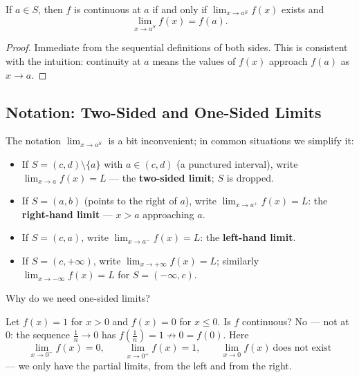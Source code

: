 \documentclass[11pt]{report}
\begin{document}
\begin{thmbox}
If $a \in S$, then $f$ is continuous at $a$ if and only if $\lim_{x\to a^S} f(x)$ exists and
\[
\lim_{x \to a^S} f(x) = f(a).
\]
\end{thmbox}

\begin{proof}
Immediate from the sequential definitions of both sides. This is consistent with the intuition: continuity at $a$ means the values of $f(x)$ approach $f(a)$ as $x \to a$.
\end{proof}

\subsection{Notation: Two-Sided and One-Sided Limits}

The notation $\lim_{x\to a^S}$ is a bit inconvenient; in common situations we simplify it:

\begin{defbox}
\begin{itemize}
    \item If $S = (c,d) \setminus \{a\}$ with $a \in (c,d)$ (a punctured interval), write $\displaystyle\lim_{x\to a} f(x) = L$ --- the \textbf{two-sided limit}; $S$ is dropped.
    \item If $S = (a, b)$ (points to the right of $a$), write $\displaystyle\lim_{x\to a^+} f(x) = L$: the \textbf{right-hand limit} --- $x > a$ approaching $a$.
    \item If $S = (c, a)$, write $\displaystyle\lim_{x\to a^-} f(x) = L$: the \textbf{left-hand limit}.
    \item If $S = (c, +\infty)$, write $\displaystyle\lim_{x\to+\infty} f(x) = L$; similarly $\displaystyle\lim_{x\to-\infty} f(x) = L$ for $S = (-\infty, c)$.
\end{itemize}
\end{defbox}

Why do we need one-sided limits?

\begin{exbox}
Let $f(x) = 1$ for $x > 0$ and $f(x) = 0$ for $x \leq 0$. Is $f$ continuous? No --- not at $0$: the sequence $\tfrac1n \to 0$ has $f(\tfrac1n) = 1 \not\to 0 = f(0)$. Here
\[
\lim_{x\to 0^-} f(x) = 0, \qquad \lim_{x\to 0^+} f(x) = 1, \qquad \lim_{x\to 0} f(x) \ \text{does not exist}
\]
--- we only have the partial limits, from the left and from the right.
\end{exbox}
\end{document}
